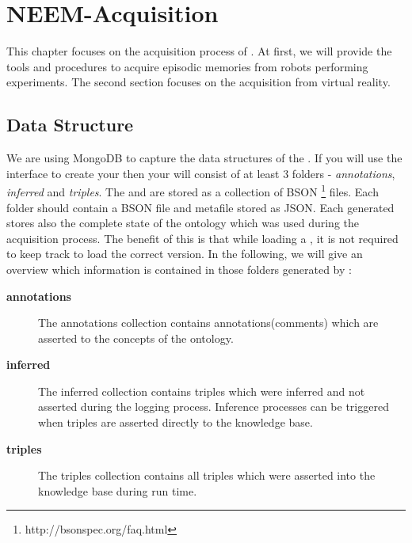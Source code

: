 \chapter{NEEM-Acquisition}
\label{ch:acquisition}

This chapter focuses on the acquisition process of \neems.
At first, we will provide the tools and procedures to acquire episodic memories from robots performing experiments.
The second section focuses on the \neem acquisition from virtual reality. 




\section{Data Structure}

We are using MongoDB to capture the data structures of the \neems.
If you will use the \knowrob interface to create your \neems then your \neem will consist of at least 3 folders - \textit{annotations}, \textit{inferred} and \textit{triples}.
The \neemnar and \neemexp are stored as a collection of BSON \footnote{http://bsonspec.org/faq.html} files.
Each folder should contain a BSON file and metafile stored as JSON.
Each generated \neem stores also the complete state of the \soma ontology which was used during the acquisition process.
The benefit of this is that while loading a \neem, it is not required to keep track to load the correct \soma version.
In the following, we will give an overview which information is contained in those folders generated by \knowrob:


\begin{description}
	\item[\textbf{annotations}] The annotations collection contains annotations(comments) which are asserted to the concepts of the ontology.
	\item[\textbf{inferred}] The inferred collection contains triples which were inferred and not asserted during the logging process. Inference processes can be triggered when triples are asserted directly to the knowledge base.
	\item[\textbf{triples}] The triples collection contains all triples which were asserted into the knowledge base during run time.
\end{description}




